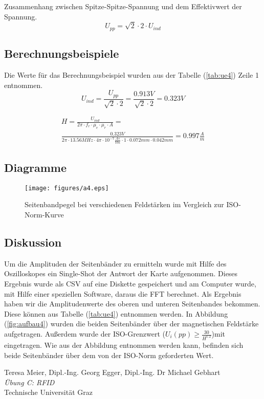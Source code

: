 \documentclass[12pt,a4paper,ngerman]{article}
\begin{document}
Zusammenhang zwischen Spitze-Spitze-Spannung und dem Effektivwert der Spannung.
\begin{equation}
U_{pp} = \sqrt{2}  \cdot 2 \cdot U_{ind}
\end{equation}

\subsection{Berechnungsbeispiele}
Die Werte für das Berechnungsbeispiel wurden aus der Tabelle (\ref{tab:ue4}) Zeile 1 entnommen.
\begin{equation}
U_{ind} = \frac{U_{pp}}{\sqrt{2}  \cdot 2} = \frac{0.913V}{\sqrt{2}  \cdot 2} = 0.323V
\end{equation}

\begin{gather}
H = \frac{U_{ind}}{2\pi \cdot f_r \cdot \mu_e \cdot \mu_r \cdot A} = \\
\frac{0.323V}{2\pi \cdot 13.56MHz \cdot 4\pi \cdot 10^{-7}\frac{As}{Vm} \cdot 1 \cdot 0.072mm \cdot 0.042mm} = 0.997 \frac{A}{m}
\end{gather}

\subsection{Diagramme}
\begin{figure}[H]
\centering
\texttt{[image: figures/a4.eps]} 
\caption{Seitenbandpegel bei verschiedenen Feldstärken im Vergleich zur ISO-Norm-Kurve}
\label{fig:a4}
\end{figure}

\subsection{Diskussion}
Um die Amplituden der Seitenbänder zu ermitteln wurde mit Hilfe des Oszilloskopes ein Single-Shot der Antwort der Karte aufgenommen. Dieses Ergebnis wurde als CSV auf eine Diskette gespeichert und am Computer wurde, mit Hilfe einer speziellen Software, daraus die FFT berechnet. Als Ergebnis haben wir die Amplitudenwerte des oberen und unteren Seitenbandes bekommen. Diese können aus Tabelle (\ref{tab:ue4}) entnommen werden. In Abbildung (\ref{fig:aufbau4}) wurden die beiden Seitenbänder über der magnetischen Feldstärke aufgetragen. Außerdem wurde der ISO-Grenzwert ($U_i(pp)\geq\frac{30}{H^{1.2}}$)mit eingetragen. Wie aus der Abbildung entnommen werden kann, befinden sich beide Seitenbänder über dem von der ISO-Norm geforderten Wert.


\begin{thebibliography}{9}

  Teresa Meier, Dipl.-Ing. Georg Egger, Dipl.-Ing. Dr Michael Gebhart\\
  \emph{Übung C: RFID}\\
  Technische Universität Graz
\end{thebibliography}

 



   
\end{document}
